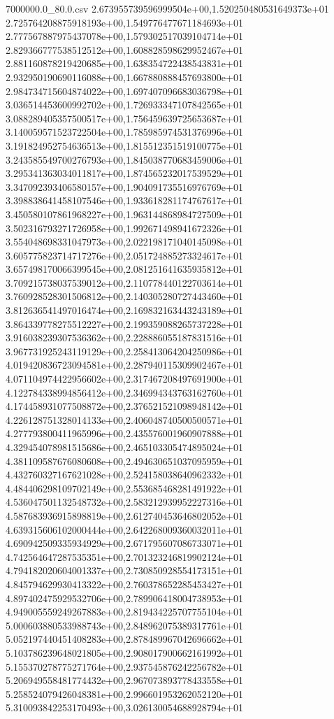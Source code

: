 \begin{filecontents*}{7000000.0_80.0.csv}
2.673955739596999504e+00,1.520250480531649373e+01
2.725764208875918193e+00,1.549776477671184693e+01
2.777567887975437078e+00,1.579302517039104714e+01
2.829366777538512512e+00,1.608828598629952467e+01
2.881160878219420685e+00,1.638354722438543831e+01
2.932950190690116088e+00,1.667880888457693800e+01
2.984734715604874022e+00,1.697407096683036798e+01
3.036514453600992702e+00,1.726933347107842565e+01
3.088289405357500517e+00,1.756459639725653687e+01
3.140059571523722504e+00,1.785985974531376996e+01
3.191824952754636513e+00,1.815512351519100775e+01
3.243585549700276793e+00,1.845038770683459006e+01
3.295341363034011817e+00,1.874565232017539529e+01
3.347092393406580157e+00,1.904091735516976769e+01
3.398838641458107546e+00,1.933618281174767617e+01
3.450580107861968227e+00,1.963144868984727509e+01
3.502316793271726958e+00,1.992671498941672326e+01
3.554048698331047973e+00,2.022198171040145098e+01
3.605775823714717276e+00,2.051724885273324617e+01
3.657498170066399545e+00,2.081251641635935812e+01
3.709215738037539012e+00,2.110778440122703614e+01
3.760928528301506812e+00,2.140305280727443460e+01
3.812636541497016474e+00,2.169832163443243189e+01
3.864339778275512227e+00,2.199359088265737228e+01
3.916038239307536362e+00,2.228886055187831516e+01
3.967731925243119129e+00,2.258413064204250986e+01
4.019420836723094581e+00,2.287940115309902467e+01
4.071104974422956602e+00,2.317467208497691900e+01
4.122784338994856412e+00,2.346994343763162760e+01
4.174458931077508872e+00,2.376521521098948142e+01
4.226128751328014133e+00,2.406048740500500571e+01
4.277793800411965996e+00,2.435576001960907888e+01
4.329454078981515686e+00,2.465103305474895024e+01
4.381109587676080608e+00,2.494630651037095959e+01
4.432760327167621028e+00,2.524158038640962332e+01
4.484406298109702149e+00,2.553685468281491922e+01
4.536047501132548732e+00,2.583212939952227316e+01
4.587683936915898819e+00,2.612740453646802052e+01
4.639315606102000444e+00,2.642268009360032011e+01
4.690942509335934929e+00,2.671795607086733071e+01
4.742564647287535351e+00,2.701323246819902124e+01
4.794182020604001337e+00,2.730850928554173151e+01
4.845794629930413322e+00,2.760378652285453427e+01
4.897402475929532706e+00,2.789906418004738953e+01
4.949005559249267883e+00,2.819434225707755104e+01
5.000603880533988743e+00,2.848962075389317761e+01
5.052197440451408283e+00,2.878489967042696662e+01
5.103786239648021805e+00,2.908017900662161992e+01
5.155370278775271764e+00,2.937545876242256782e+01
5.206949558481774432e+00,2.967073893778433558e+01
5.258524079426048381e+00,2.996601953262052120e+01
5.310093842253170493e+00,3.026130054688928794e+01

\end{filecontents*}
